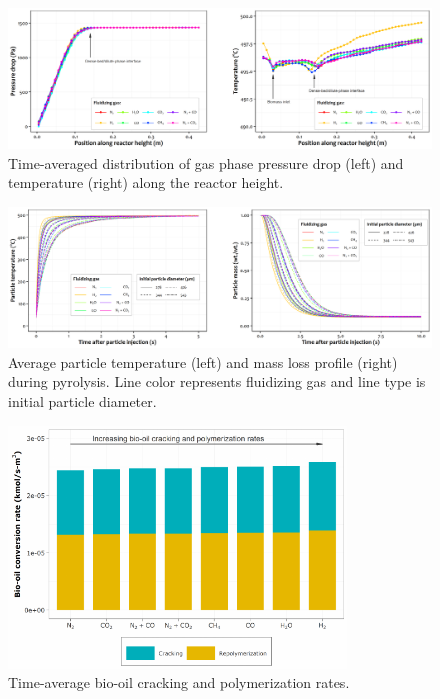 \begin{figure}[H]
    \centering
    \includegraphics[width=\textwidth]{figures/cfd-pressure-temp.png}
    \caption{Time-averaged distribution of gas phase pressure drop (left) and temperature (right) along the reactor height.}
    \label{fig:cfd-press-temp}
\end{figure}

\begin{figure}[H]
    \centering
    \includegraphics[width=\textwidth]{figures/cfd-particle-mass.png}
    \caption{Average particle temperature (left) and mass loss profile (right) during pyrolysis. Line color represents fluidizing gas and line type is initial particle diameter.}
    \label{fig:cfd-particle}
\end{figure}

\begin{figure}[H]
    \centering
    \includegraphics[width=0.8\textwidth]{figures/cfd-biooil.pdf}
    \caption{Time-average bio-oil cracking and polymerization rates.}
    \label{fig:cfd-biooil}
\end{figure}

